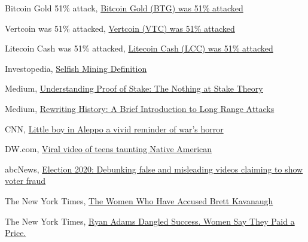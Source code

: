 \documentclass[target=mst,aauheader=]{thud}
\begin{document}
\begin{thebibliography}{99}
    Bitcoin Gold 51\% attack, \href{https://gist.github.com/metalicjames/71321570a105940529e709651d0a9765}{Bitcoin Gold (BTG) was 51\% attacked}

    Vertcoin was 51\% attacked, \href{https://gist.github.com/metalicjames/f2acdb9ef448ec5298173b36c7c54133}{Vertcoin (VTC) was 51\% attacked}

    Litecoin Cash was 51\% attacked, \href{https://gist.github.com/metalicjames/82a49f8afa87334f929881e55ad4ffd7}{Litecoin Cash (LCC) was 51\% attacked}

    Investopedia, \href{https://www.investopedia.com/terms/s/selfish-mining.asp}{Selfish Mining Definition}

    Medium, \href{https://medium.com/coinmonks/understanding-proof-of-stake-the-nothing-at-stake-theory-1f0d71bc027}{Understanding Proof of Stake: The Nothing at Stake Theory}

    Medium, \href{https://blog.positive.com/rewriting-history-a-brief-introduction-to-long-range-attacks-54e473acdba9}{Rewriting History: A Brief Introduction to Long Range Attacks}


    CNN, \href{https://edition.cnn.com/2016/08/17/world/syria-little-boy-airstrike-victim/index.html}{Little boy in Aleppo a vivid reminder of war’s horror}

    DW.com, \href{https://www.dw.com/en/outrage-as-teens-mock-native-american-at-washington-rally/a-47156592}{Viral video of teens taunting Native American}

    abcNews, \href{https://abcnews.go.com/Politics/election-2020-debunking-false-misleading-videos-claiming-show/story?id=74148233}{Election 2020: Debunking false and misleading videos claiming to show voter fraud}

    The New York Times, \href{https://www.nytimes.com/2018/09/26/us/politics/brett-kavanaugh-accusers-women.html}{The Women Who Have Accused Brett Kavanaugh}

    The New York Times, \href{2019, a journalist from the New York Times conducted an interview with a woman who accused the musician Ryan Adams of sexual misconduct}{Ryan Adams Dangled Success. Women Say They Paid a Price.}


\end{thebibliography}
\end{document}
